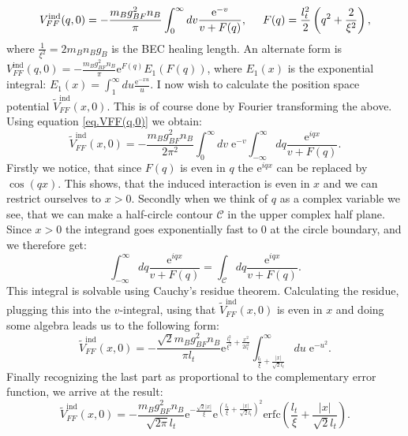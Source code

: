 \begin{equation}
V_{FF}^\text{ind}(q,0) = -\frac{m_Bg_{BF}^2n_B}{\pi}\int_{0}^\infty dv \frac{\text{e}^{-v}}{v+F(q)}, \hspace{0.5cm} F(q) = \frac{l_t^2}{2}\left(q^2+\frac{2}{\xi^2} \right),
\label{eq.VFF(q,0)}
\end{equation}
where $\frac{1}{\xi^2} = 2m_Bn_Bg_B$ is the BEC healing length. An alternate form is $V_{FF}^\text{ind}(q,0) = -\frac{m_Bg_{BF}^2n_B}{\pi} \text{e}^{F(q)} E_1(F(q))$, where $E_1(x)$ is the exponential integral: $E_1(x) = \int_1^\infty du \frac{\text{e}^{-xu}}{u}$. I now wish to calculate the position space potential $\tilde{V}_{FF}^\text{ind}(x,0)$. This is of course done by Fourier transforming the above. Using equation \eqref{eq.VFF(q,0)} we obtain:
\begin{equation}
\tilde{V}_{FF}^\text{ind}(x,0) = -\frac{m_Bg_{BF}^2n_B}{2\pi^2}\int_0^\infty dv\;  \text{e}^{-v}\int_{-\infty}^\infty dq \frac{\text{e}^{iqx}}{v+F(q)}.
\end{equation}
Firstly we notice, that since $F(q)$ is even in $q$ the $\text{e}^{iqx}$ can be replaced by $\cos(qx)$. This shows, that the induced interaction is even in $x$ and we can restrict ourselves to $x > 0$. Secondly when we think of $q$ as a complex variable we see, that we can make a half-circle contour $\mathcal{C}$ in the upper complex half plane. Since $x>0$ the integrand goes exponentially fast to 0 at the circle boundary, and we therefore get:
\begin{equation}
\int_{-\infty}^\infty dq \frac{\text{e}^{iqx}}{v+F(q)} = \int_\mathcal{C} dq  \frac{\text{e}^{iqx}}{v+F(q)}. \nonumber
\end{equation}
This integral is solvable using Cauchy's residue theorem. Calculating the residue, plugging this into the $v$-integral, using that $\tilde{V}_{FF}^\text{ind}(x,0)$ is even in $x$ and doing some algebra leads us to the following form:
\begin{equation}
\tilde{V}_{FF}^\text{ind}(x,0) = -\frac{\sqrt{2}m_Bg_{BF}^2n_B}{\pi l_t}\text{e}^{\frac{l_t^2}{\xi^2}+\frac{x^2}{2l_t^2}}\int_{\frac{l_t}{\xi}+\frac{|x|}{\sqrt{2}l_t}}^\infty du \; \text{e}^{-u^2}. \nonumber
\end{equation}
Finally recognizing the last part as proportional to the complementary error function, we arrive at the result:
\begin{equation}
\tilde{V}_{FF}^\text{ind}(x,0) = -\frac{m_Bg_{BF}^2n_B}{\sqrt{2\pi} l_t} \text{e}^{-\frac{\sqrt{2}|x|}{\xi}}\text{e}^{\left(\frac{l_t}{\xi}+\frac{|x|}{\sqrt{2}l_t}\right)^2}\text{erfc}\left(\frac{l_t}{\xi}+\frac{|x|}{\sqrt{2}l_t}\right).
\label{eq.VFFx_exact}
\end{equation}
